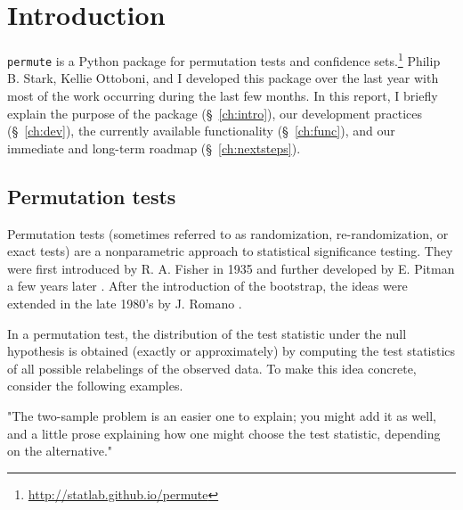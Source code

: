 \chapter{\label{ch:intro}Introduction}

\texttt{permute} is a Python package for permutation tests and confidence
sets.\footnote{\url{http://statlab.github.io/permute}}
Philip B. Stark, Kellie Ottoboni, and I developed this package over the
last year with most of the work occurring during the last few months.
In this report, I briefly explain the purpose of the package (\S~\ref{ch:intro}), our
development practices (\S~\ref{ch:dev}), the currently available functionality (\S~\ref{ch:func}), and
our immediate and long-term roadmap (\S~\ref{ch:nextsteps}).

\section{Permutation tests}

Permutation tests (sometimes referred to as randomization, re-randomization, or
exact tests) are a nonparametric approach to statistical significance testing.
They were first introduced by R. A. Fisher in 1935 and further developed by E.
Pitman a few years later \cite{fisher1935design, pitman1937,
pitman1938significance}.  After the introduction of the bootstrap, the ideas
were extended in the late 1980's by J. Romano \cite{romano1988bootstrap,
romano1989bootstrap}.

In a permutation test, the distribution of the test statistic under the null
hypothesis is obtained (exactly or approximately) by computing the test
statistics of all possible relabelings of the observed data.  To make this
idea concrete, consider the following examples.


\begin{exmp}
"The two-sample problem is an easier one to explain; you might add it as well,
and a little prose explaining how one might choose the test statistic,
depending on the alternative."
\end{exmp}

